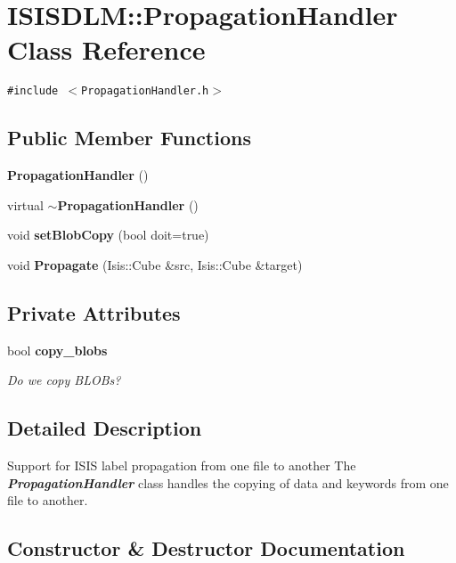 \section{ISISDLM::Propagation\-Handler Class Reference}
\label{classISISDLM_1_1PropagationHandler}
{\tt \#include $<$Propagation\-Handler.h$>$}

\subsection*{Public Member Functions}
\begin{CompactItemize}
\item 
{\bf Propagation\-Handler} ()
\item 
virtual {\bf $\sim$Propagation\-Handler} ()
\item 
void {\bf set\-Blob\-Copy} (bool doit=true)
\item 
void {\bf Propagate} (Isis::Cube \&src, Isis::Cube \&target)
\end{CompactItemize}
\subsection*{Private Attributes}
\begin{CompactItemize}
\item 
bool {\bf copy\_\-blobs}
\begin{CompactList}\small\item\em Do we copy BLOBs? \item\end{CompactList}\end{CompactItemize}


\subsection{Detailed Description}
Support for ISIS label propagation from one file to another The {\em {\bf Propagation\-Handler}\/} class handles the copying of data and keywords from one file to another. 



\subsection{Constructor \& Destructor Documentation}
